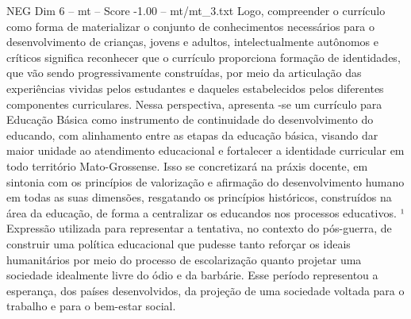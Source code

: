 \begin{textsample}{NEG Dim 6 – mt – Score -1.00 – mt/mt\_3.txt}
Logo, compreender o currículo como forma de materializar o conjunto de conhecimentos necessários para o desenvolvimento de crianças, jovens e adultos, intelectualmente autônomos e críticos significa reconhecer que o currículo proporciona formação de identidades, que vão sendo progressivamente construídas, por meio da articulação das experiências vividas pelos estudantes e daqueles estabelecidos pelos diferentes componentes curriculares.
Nessa perspectiva, apresenta -se um currículo para Educação Básica como instrumento de continuidade do desenvolvimento do educando, com alinhamento entre as etapas da educação básica, visando dar maior unidade ao atendimento educacional e fortalecer a identidade curricular em todo território Mato-Grossense.
Isso se concretizará na práxis docente, em sintonia com os princípios de valorização e afirmação do desenvolvimento humano em todas as suas dimensões, resgatando os princípios históricos, construídos na área da educação, de forma a centralizar os educandos nos processos educativos. ¹ Expressão utilizada para representar a tentativa, no contexto do pós-guerra, de construir uma política educacional que pudesse tanto reforçar os ideais humanitários por meio do processo de escolarização quanto projetar uma sociedade idealmente livre do ódio e da barbárie.
Esse período representou a esperança, dos países desenvolvidos, da projeção de uma sociedade voltada para o trabalho e para o bem-estar social.

\end{textsample}
